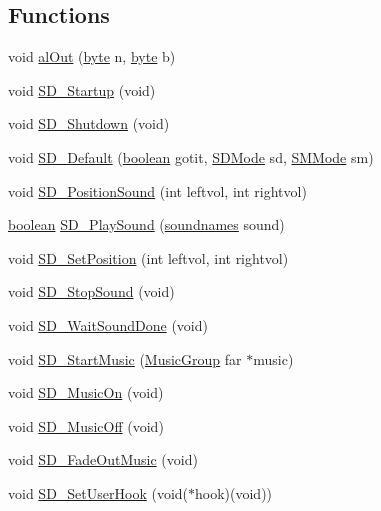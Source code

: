 \subsection*{Functions}
\begin{DoxyCompactItemize}
\item 
void \hyperlink{ID__SD_8H_a022c0a65b79644cb7ea86a2ce77b3c42}{alOut} (\hyperlink{ID__HEAD_8H_a0c8186d9b9b7880309c27230bbb5e69d}{byte} n, \hyperlink{ID__HEAD_8H_a0c8186d9b9b7880309c27230bbb5e69d}{byte} b)
\item 
void \hyperlink{ID__SD_8H_a9e273885efbb6410be25e887f5ac6bdd}{SD\_\-Startup} (void)
\item 
void \hyperlink{ID__SD_8H_ac6d96b7bc78afb4c50dba50009ea7cfa}{SD\_\-Shutdown} (void)
\item 
void \hyperlink{ID__SD_8H_a00b19d7c488bf8f1b9336e51831462c1}{SD\_\-Default} (\hyperlink{ID__HEAD_8H_a7c6368b321bd9acd0149b030bb8275ed}{boolean} gotit, \hyperlink{ID__SD_8H_af66c128f54042fe02b7297e3e29a8b6d}{SDMode} sd, \hyperlink{ID__SD_8H_ac43ff64e0d1da85aa6fee6723a38a4de}{SMMode} sm)
\item 
void \hyperlink{ID__SD_8H_a6709a4f68792058fd47b17196b876aee}{SD\_\-PositionSound} (int leftvol, int rightvol)
\item 
\hyperlink{ID__HEAD_8H_a7c6368b321bd9acd0149b030bb8275ed}{boolean} \hyperlink{ID__SD_8H_af6a678e2015e6474a341bbd8ab03c12f}{SD\_\-PlaySound} (\hyperlink{AUDIOSDM_8H_a4a3d02bfe7b02201dbba1993b77ae7e1}{soundnames} sound)
\item 
void \hyperlink{ID__SD_8H_ac3f6132e336a573c7bee820b0acebd65}{SD\_\-SetPosition} (int leftvol, int rightvol)
\item 
void \hyperlink{ID__SD_8H_ac98e41e0645d624d0645219c8eca9615}{SD\_\-StopSound} (void)
\item 
void \hyperlink{ID__SD_8H_a92c51dce596da266c75185c1c5b37095}{SD\_\-WaitSoundDone} (void)
\item 
void \hyperlink{ID__SD_8H_a1b66a386f3785697d07238f3610e3b89}{SD\_\-StartMusic} (\hyperlink{structMusicGroup}{MusicGroup} far $\ast$music)
\item 
void \hyperlink{ID__SD_8H_a3de23daedac0200fbc38736dd8c755e3}{SD\_\-MusicOn} (void)
\item 
void \hyperlink{ID__SD_8H_ae8e46be37d6285a8cc13d7a68c9f1a0e}{SD\_\-MusicOff} (void)
\item 
void \hyperlink{ID__SD_8H_afa09f503f31c9e9c4d77cf6dc8a0932f}{SD\_\-FadeOutMusic} (void)
\item 
void \hyperlink{ID__SD_8H_aaa16861d631580a6d7abb257df4a9555}{SD\_\-SetUserHook} (void($\ast$hook)(void))

\end{DoxyCompactItemize}
